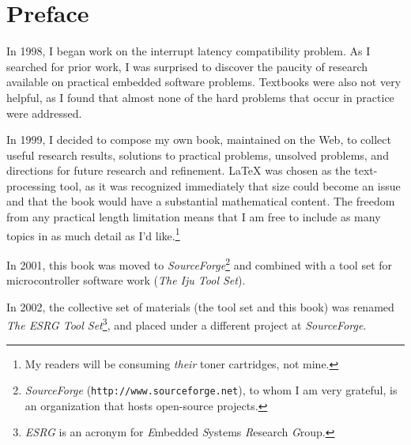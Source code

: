 %
%
\chapter{Preface}

In 1998, I began work on the
interrupt latency compatibility problem.  As I searched
for prior work, I was
surprised to discover the paucity
of research available on practical embedded software
problems.  Textbooks were also not very helpful,
as I found that almost none
of the hard
problems that occur in practice
were addressed.

In 1999, I decided to compose my own book,
maintained on the Web,
to collect useful
research results, solutions to practical problems,
unsolved problems, and directions for future
research and refinement.
\LaTeX{} was chosen as the text-processing
tool, as it was 
recognized immediately
that size could become an issue and that the book
would have a substantial mathematical content.
The freedom from any practical length
limitation
means that I am
free to include as many topics
in as much detail as I'd like.\footnote{My readers will
be consuming \emph{their} toner cartridges, not mine.}

In 2001, this book was moved to 
\emph{SourceForge}\footnote{\emph{SourceForge}
(\texttt{http://www.sourceforge.net}), to whom I am very grateful,
is an organization that hosts open-source projects.} and
combined with a tool
set for microcontroller software work 
(\emph{The Iju Tool Set}).

In 2002, the collective set of materials (the tool set and this book) 
was renamed \emph{The ESRG Tool Set}\footnote{\emph{ESRG}
is an acronym for \emph{E}mbedded \emph{S}ystems \emph{R}esearch \emph{G}roup.}, 
and placed under a different
project at \emph{SourceForge}.

